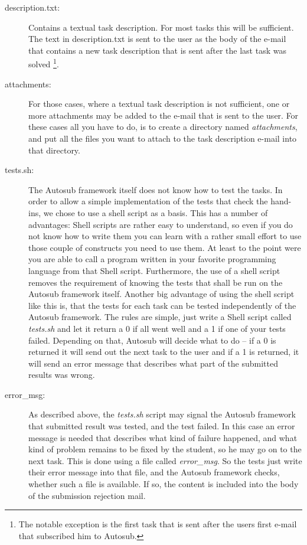 \begin{description}
\item [description.txt:] Contains a textual task description. For most tasks this will
be sufficient. The text in description.txt is sent to the user as the body of the e-mail
that contains a new task description that is sent after the last task was solved
\footnote{The notable exception is the first task that is sent after the users first e-mail
that subscribed him to Autosub.}.
\item [attachments:] For those cases, where a textual task description is not sufficient,
one or more attachments may be added to the e-mail that is sent to the user. For these cases
all you have to do, is to create a directory named {\it attachments}, and put all the files
you want to attach to the task description e-mail into that directory.
\item [tests.sh:] The Autosub framework itself does not know how to test the tasks. In order
to allow a simple implementation of the tests that check the hand-ins, we chose to use a
shell script as a basis. This has a number of advantages: Shell scripts are rather easy to
understand, so even if you do not know how to write them you can learn with a rather small
effort to use those couple of constructs you need to use them. At least to the point were
you are able to call a program written in your favorite programming language from that Shell
script. Furthermore, the use of a shell script removes the requirement of knowing the tests
that shall be run on the Autosub framework itself.
Another big advantage of using the shell script like this is, that the tests for each task
can be tested independently of the Autosub framework.
The rules are simple, just write a Shell script called {\it tests.sh} and let it return a 0
if all went well and a 1 if one of your tests failed. Depending on that, Autosub will decide
what to do -- if a 0 is returned it will send out the next task to the user and if a 1 is
returned, it will send an error message that describes what part of the submitted results
was wrong.
\item [error\_msg:] As described above, the {\it tests.sh} script may signal the Autosub
framework that submitted result was tested, and the test failed. In this case an error message
is needed that describes what kind of failure happened, and what kind of problem remains
to be fixed by the student, so he may go on to the next task. This is done using a file
called {\it error\_msg}. So the tests just write their error message into that file, and the
Autosub framework checks, whether such a file is available. If so, the content is included
into the body of the submission rejection mail.
\end{description}

